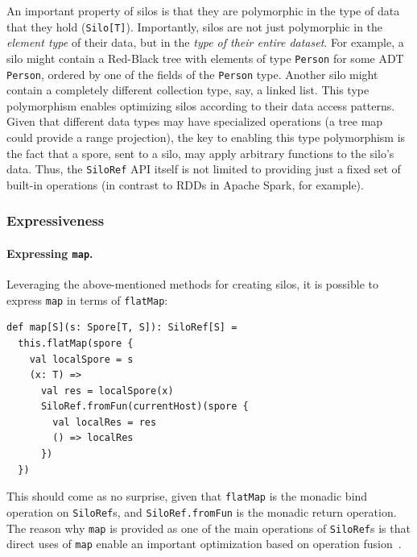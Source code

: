 \documentclass{jfp1}
\begin{document}
An important property of silos is that they are polymorphic in the type of data
that they hold (\verb|Silo[T]|). Importantly, silos are not just polymorphic in
the {\em element type} of their data, but in the {\em type of their entire
dataset}. For example, a silo might contain a Red-Black tree with elements of
type \verb|Person| for some ADT \verb|Person|, ordered by one of the fields of
the \verb|Person| type. Another silo might contain a completely different
collection type, say, a linked list. This type polymorphism enables optimizing
silos according to their data access patterns. Given that different data types
may have specialized operations (\eg a tree map could provide a range
projection), the key to enabling this type polymorphism is the fact that a
spore, sent to a silo, may apply arbitrary functions to the silo's data. Thus,
the \verb|SiloRef| API itself is not limited to providing just a fixed set of
built-in operations (in contrast to RDDs in Apache Spark, for example).

\subsubsection{Expressiveness}
\label{sec:expr}

\paragraph{Expressing \texttt{map}.}

Leveraging the above-mentioned methods for creating silos, it is possible to
express \verb|map| in terms of \verb|flatMap|:

\begin{lstlisting}
def map[S](s: Spore[T, S]): SiloRef[S] =
  this.flatMap(spore {
    val localSpore = s
    (x: T) =>
      val res = localSpore(x)
      SiloRef.fromFun(currentHost)(spore {
        val localRes = res
        () => localRes
      })
  })
\end{lstlisting}

\noindent
This should come as no surprise, given that \verb|flatMap| is the monadic bind
operation on \verb|SiloRef|s, and \verb|SiloRef.fromFun| is the monadic return
operation. The reason why \verb|map| is provided as one of the main operations
of \verb|SiloRef|s is that direct uses of \verb|map| enable an important
optimization based on operation fusion~\cite{FlumeJava}.
\end{document}
